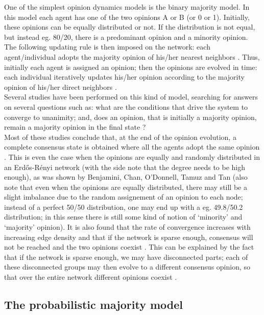 \documentclass[11 pt , letterpaper , twoside , openright]{book}
\begin{document}
One of the simplest opinion dynamics models is the binary majority model. In this model each agent has one of the two opinions A or B (or 0 or 1). Initially, these opinions can be equally distributed or not. If the distribution is not equal, but instead eg. 80/20, there is a predominant opinion and a minority opinion.\\
The following updating rule is then imposed on the network: each agent/individual adopts the majority opinion of his/her nearest neighbors \cite{Nguyen2020}. Thus, initially each agent is assigned an opinion; then the opinions are evolved in time: each individual iteratively updates his/her opinion according to the majority opinion of his/her direct neighbors \cite{Nguyen2020}.\\
\newline
Several studies have been performed on this kind of model, searching for answers on several questions such as: what are the conditions that drive the system to converge to unanimity; and, does an opinion, that is initially a majority opinion, remain a majority opinion in the final state \cite{Nguyen2020}? \\
Most of these studies conclude that, at the end of the opinion evolution, a complete consensus state is obtained where all the agents adopt the same opinion \cite{Nguyen2020}. This is even the case when the opinions are equally and randomly distributed in an Erd\H{o}s-R\'{e}nyi network (with the side note that the degree needs to be high enough), as was shown by Benjamini, Chan, O'Donnell, Tamuz and Tan \cite{Benjamini2016} (also note that even when the opinions are equally distributed, there may still be a slight imbalance due to the random assignement of an opinion to each node; instead of a perfect 50/50 distribution, one may end up with a eg. 49.8/50.2 distribution; in this sense there is still some kind of notion of `minority' and `majority' opinion). It is also found that the rate of convergence increases with increasing edge density and that if the network is sparse enough, consensus will not be reached and the two opinions coexist \cite{Nguyen2020}. This can be explained by the fact that if the network is sparse enough, we may have disconnected parts; each of these disconnected groups may then evolve to a different consensus opinion, so that over the entire network different opinions coexist \cite{Nguyen2020}.

\subsection{The probabilistic majority model}\label{probMaj}
\end{document}
